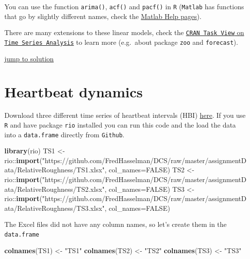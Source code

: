 \documentclass[]{book}
\newenvironment{Shaded}{\begin{snugshade}}{\end{snugshade}}
\newcommand{\KeywordTok}[1]{\textcolor[rgb]{0.13,0.29,0.53}{\textbf{{#1}}}}
\newcommand{\DataTypeTok}[1]{\textcolor[rgb]{0.13,0.29,0.53}{{#1}}}
\newcommand{\StringTok}[1]{\textcolor[rgb]{0.31,0.60,0.02}{{#1}}}
\newcommand{\OtherTok}[1]{\textcolor[rgb]{0.56,0.35,0.01}{{#1}}}
\newcommand{\NormalTok}[1]{{#1}}
\let\stdsection\section
\renewcommand\section{\newpage\stdsection}
\begin{document}
You can use the function \texttt{arima()}, \texttt{acf()} and
\texttt{pacf()} in \texttt{R} (\texttt{Matlab} has functions that go by
slightly different names, check the
\href{https://nl.mathworks.com/help/econ/autocorr.html}{Matlab Help
pages}).

There are many extensions to these linear models, check the
\href{https://cran.r-project.org/web/views/TimeSeries.html}{\texttt{CRAN\ Task\ View}
on \texttt{Time\ Series\ Analysis}} to learn more (e.g.~about package
\texttt{zoo} and \texttt{forecast}).

\protect\hyperlink{bTSAinRsol}{\textbar{} jump to solution \textbar{}}

\hypertarget{hrv}{\section{Heartbeat dynamics}\label{hrv}}

Download three different time series of heartbeat intervals (HBI)
\href{https://github.com/FredHasselman/DCS/tree/master/assignmentData/RelativeRoughness}{here}.
If you use \texttt{R} and have package \texttt{rio} installed you can
run this code and the load the data into a \texttt{data.frame} directly
from \texttt{Github}.

\begin{Shaded}
\begin{Highlighting}[]
\KeywordTok{library}\NormalTok{(rio)}
\NormalTok{TS1 <-}\StringTok{ }\NormalTok{rio::}\KeywordTok{import}\NormalTok{(}\StringTok{"https://github.com/FredHasselman/DCS/raw/master/assignmentData/RelativeRoughness/TS1.xlsx"}\NormalTok{, }\DataTypeTok{col_names=}\OtherTok{FALSE}\NormalTok{)}
\NormalTok{TS2 <-}\StringTok{ }\NormalTok{rio::}\KeywordTok{import}\NormalTok{(}\StringTok{"https://github.com/FredHasselman/DCS/raw/master/assignmentData/RelativeRoughness/TS2.xlsx"}\NormalTok{, }\DataTypeTok{col_names=}\OtherTok{FALSE}\NormalTok{)}
\NormalTok{TS3 <-}\StringTok{ }\NormalTok{rio::}\KeywordTok{import}\NormalTok{(}\StringTok{"https://github.com/FredHasselman/DCS/raw/master/assignmentData/RelativeRoughness/TS3.xlsx"}\NormalTok{, }\DataTypeTok{col_names=}\OtherTok{FALSE}\NormalTok{)}
\end{Highlighting}
\end{Shaded}

The Excel files did not have any column names, so let's create them in
the \texttt{data.frame}

\begin{Shaded}
\begin{Highlighting}[]
\KeywordTok{colnames}\NormalTok{(TS1) <-}\StringTok{ "TS1"}
\KeywordTok{colnames}\NormalTok{(TS2) <-}\StringTok{ "TS2"}
\KeywordTok{colnames}\NormalTok{(TS3) <-}\StringTok{ "TS3"}
\end{Highlighting}
\end{Shaded}
\end{document}
